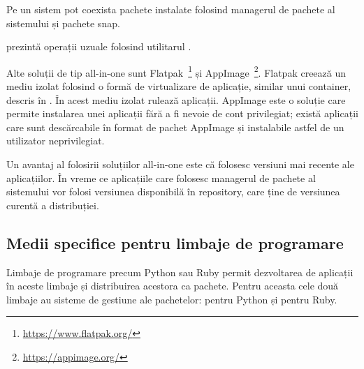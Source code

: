 Pe un sistem pot coexista pachete instalate folosind managerul de pachete al sistemului și pachete snap.

 prezintă operații uzuale folosind utilitarul .


Alte soluții de tip all-in-one sunt Flatpak~\footnote{\url{https://www.flatpak.org/}} și AppImage~\footnote{\url{https://appimage.org/}}. Flatpak creează un mediu izolat folosind o formă de virtualizare de aplicație, similar unui container, descris în . În acest mediu izolat rulează aplicații. AppImage este o soluție care permite instalarea unei aplicații fără a fi nevoie de cont privilegiat; există aplicații care sunt descărcabile în format de pachet AppImage și instalabile astfel de un utilizator neprivilegiat.

Un avantaj al folosirii soluțiilor all-in-one este că folosesc versiuni mai recente ale aplicațiilor. În vreme ce aplicațiile care folosesc managerul de pachete al sistemului vor folosi versiunea disponibilă în repository, care ține de versiunea curentă a distribuției.

\subsection{Medii specifice pentru limbaje de programare}
\label{sec:package:specific}

Limbaje de programare precum Python sau Ruby permit dezvoltarea de aplicații în aceste limbaje și distribuirea acestora ca pachete. Pentru aceasta cele două limbaje au sisteme de gestiune ale pachetelor:  pentru Python și  pentru Ruby.

